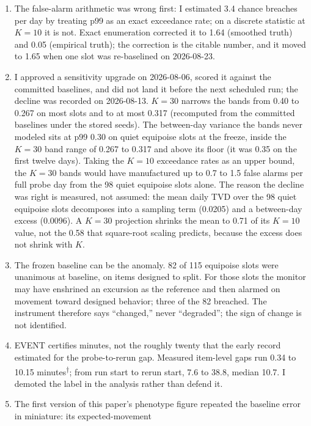 \documentclass[conference]{IEEEtran}
\newcommand{\rows}{\textsuperscript{$\dagger$}}
\begin{document}
\begin{enumerate}
\item[(a)] The false-alarm arithmetic was wrong first: I estimated 3.4
  chance breaches per day by treating p99 as an exact exceedance rate;
  on a discrete statistic at $K{=}10$ it is not. Exact enumeration
  corrected it to 1.64 (smoothed truth) and 0.05 (empirical truth);
  the correction is the citable number, and it moved to 1.65 when one
  slot was re-baselined on 2026-08-23.
\item[(b)] I approved a sensitivity upgrade on 2026-08-06, scored
  it against the committed baselines, and did not land it before the
  next scheduled run; the decline was recorded on 2026-08-13. $K{=}30$
  narrows the bands from 0.40 to 0.267 on most slots and to at most
  0.317 (recomputed from the committed baselines under the stored
  seeds). The between-day variance the bands never modeled sits at p99
  0.30 on quiet equipoise slots at the freeze, inside the $K{=}30$
  band range of 0.267 to 0.317 and above its floor (it was 0.35 on the
  first twelve days). Taking the $K{=}10$ exceedance rates as an upper
  bound, the $K{=}30$ bands would have manufactured up to 0.7 to 1.5
  false alarms per full probe day from the 98 quiet equipoise slots
  alone. The reason the decline was right is measured, not assumed:
  the mean daily TVD over the 98 quiet equipoise slots decomposes into
  a sampling term (0.0205) and a between-day excess (0.0096). A
  $K{=}30$ projection shrinks the mean to 0.71 of its $K{=}10$ value,
  not the 0.58 that square-root scaling predicts, because the excess
  does not shrink with $K$.
\item[(c)] The frozen baseline can be the anomaly. 82 of 115
  equipoise slots were unanimous at baseline, on items designed to
  split. For those slots the monitor may have enshrined an excursion
  as the reference and then alarmed on movement toward designed
  behavior; three of the 82 breached. The instrument therefore says
  ``changed,'' never ``degraded''; the sign of change is not
  identified.
\item[(d)] EVENT certifies minutes, not the roughly
  twenty that the early record estimated for the probe-to-rerun gap.
  Measured item-level gaps run 0.34 to 10.15 minutes\rows; from run
  start to rerun start, 7.6 to 38.8, median 10.7. I demoted the label
  in the analysis rather than defend it.
\item[(e)] The first version of this paper's phenotype figure
  repeated the baseline error in miniature: its expected-movement

\end{enumerate}
\end{document}
